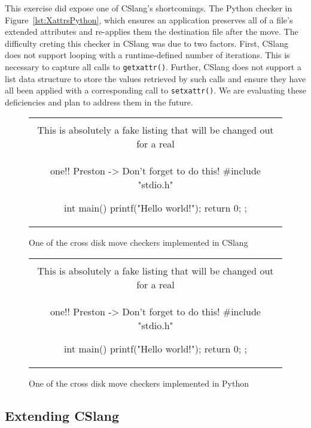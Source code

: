 This exercise did expose one of CSlang's shortcomings.
The Python checker in Figure~\ref{lst:XattrsPython},
which ensures an application
preserves all of a file's extended attributes and re-applies them the
destination file after the move.
The difficulty creting this checker
in CSlang was due to two factors.
First, CSlang does not support looping with a
runtime-defined number of iterations.  This is necessary to capture all
calls to {\tt getxattr()}.
Further, CSlang does not support a list data structure to store the values
retrieved by such calls and ensure they have all been applied with a
corresponding call to {\tt setxattr()}.
We are evaluating these deficiencies and plan to address them in the
future.

\begin{figure}[H]
\centering
\begin{tabular}{c}
\begin{lstlisting}
\\ This is absolutely a fake listing that will be changed out for a real
\\ one!!  Preston -> Don't forget to do this!
#include "stdio.h"

int main() {
    printf("Hello world!\n");
    return 0;
};
\end{lstlisting}
\end{tabular}
\caption{One of the cross disk move checkers implemented in CSlang}
\label{lst:Cross-DiskMoveCSlang}
\end{figure}


\begin{figure}[H]
\centering
\begin{tabular}{c}
\begin{lstlisting}
\\ This is absolutely a fake listing that will be changed out for a real
\\ one!!  Preston -> Don't forget to do this!
#include "stdio.h"

int main() {
    printf("Hello world!\n");
    return 0;
};
\end{lstlisting}
\end{tabular}
\caption{One of the cross disk move checkers implemented in Python}
\label{lst:Cross-DiskMovePython}
\end{figure}

\subsection{Extending CSlang}

